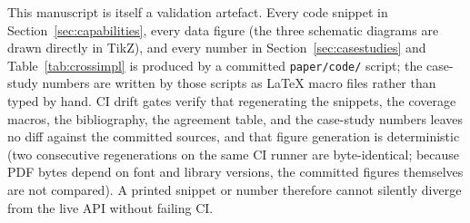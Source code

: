 This manuscript is itself a validation artefact.
Every code snippet in Section~\ref{sec:capabilities}, every data figure (the
three schematic diagrams are drawn directly in TikZ), and every number in Section~\ref{sec:casestudies} and Table~\ref{tab:crossimpl} is
produced by a committed \texttt{paper/code/} script; the case-study numbers
are written by those scripts as \LaTeX{} macro files rather than typed by
hand.  CI drift gates verify that regenerating the snippets, the coverage
macros, the bibliography, the agreement table, and the case-study numbers
leaves no diff against the committed sources, and that figure generation is
deterministic (two consecutive regenerations on the same CI runner are
byte-identical; because PDF bytes depend on font and library versions, the
committed figures themselves are not compared).
A printed snippet or number therefore cannot silently diverge from the live
API without failing CI.
